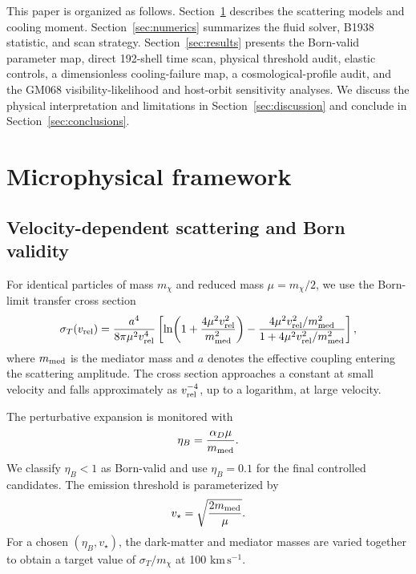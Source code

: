 \documentclass[12pt]{iopart}
\newcommand{\sigmavm}{\sigma_T/m_\chi}
\newcommand{\vrel}{v_{\rm rel}}
\newcommand{\vstar}{v_\star}
\begin{document}
This paper is organized as follows.  Section~\ref{sec:microphysics} describes
the scattering models and cooling moment.  Section~\ref{sec:numerics}
summarizes the fluid solver, B1938 statistic, and scan strategy.
Section~\ref{sec:results} presents the Born-valid parameter map, direct
192-shell time scan, physical threshold audit, elastic controls, a
dimensionless cooling-failure map, a cosmological-profile audit, and the
GM068 visibility-likelihood and host-orbit sensitivity analyses.  We
discuss the physical interpretation and limitations in
Section~\ref{sec:discussion} and conclude in Section~\ref{sec:conclusions}.

\section{Microphysical framework}
\label{sec:microphysics}

\subsection{Velocity-dependent scattering and Born validity}

For identical particles of mass $m_\chi$ and reduced mass
$\mu=m_\chi/2$, we use the Born-limit transfer cross section
\begin{equation}
  \sigma_T(\vrel)=\frac{a^4}{8\pi\mu^2\vrel^4}
  \left[
  \ln\!\left(1+\frac{4\mu^2\vrel^2}{m_{\rm med}^2}\right)
  -\frac{4\mu^2\vrel^2/m_{\rm med}^2}
  {1+4\mu^2\vrel^2/m_{\rm med}^2}
  \right],
  \label{eq:sigma-transfer}
\end{equation}
where $m_{\rm med}$ is the mediator mass and $a$ denotes the effective
coupling entering the scattering amplitude.  The cross section approaches a
constant at small velocity and falls approximately as $\vrel^{-4}$, up to a
logarithm, at large velocity.

The perturbative expansion is monitored with
\begin{equation}
  \eta_B=\frac{\alpha_D\mu}{m_{\rm med}}.
  \label{eq:born-parameter}
\end{equation}
We classify $\eta_B<1$ as Born-valid and use $\eta_B=0.1$ for the final
controlled candidates.  The emission threshold is parameterized by
\begin{equation}
  \vstar=\sqrt{\frac{2m_{\rm med}}{\mu}}.
  \label{eq:threshold}
\end{equation}
For a chosen $(\eta_B,\vstar)$, the dark-matter and mediator masses are varied
together to obtain a target value of $\sigmavm$ at 100 $\mathrm{km\,s^{-1}}$.
\end{document}
